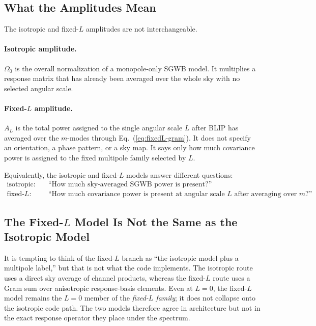\documentclass[11pt]{article}
\begin{document}
\subsection{What the Amplitudes Mean}
The isotropic and fixed-$L$ amplitudes are not interchangeable.

\paragraph{Isotropic amplitude.}
\(\Omega_0\) is the overall normalization of a monopole-only SGWB model. It multiplies a response matrix that has already been averaged over the whole sky with no selected angular scale.

\paragraph{Fixed-\texorpdfstring{$L$}{L} amplitude.}
\(A_L\) is the total power assigned to the single angular scale \(L\) after BLIP has averaged over the \(m\)-modes through Eq.~(\ref{eq:fixedL-gram}). It does not specify an orientation, a phase pattern, or a sky map. It says only how much covariance power is assigned to the fixed multipole family selected by \(L\).

Equivalently, the isotropic and fixed-$L$ models answer different questions:
\begin{align}
\text{isotropic:}\quad & \text{``How much sky-averaged SGWB power is present?''} \\
\text{fixed-}L:\quad & \text{``How much covariance power is present at angular scale }L\text{ after averaging over }m\text{?''}
\end{align}

\subsection{The Fixed-\texorpdfstring{$L$}{L} Model Is Not the Same as the Isotropic Model}
It is tempting to think of the fixed-$L$ branch as ``the isotropic model plus a multipole label,'' but that is not what the code implements. The isotropic route uses a direct sky average of channel products, whereas the fixed-$L$ route uses a Gram sum over anisotropic response-basis elements. Even at \(L=0\), the fixed-$L$ model remains the \(L=0\) member of the \emph{fixed-$L$ family}; it does not collapse onto the isotropic code path. The two models therefore agree in architecture but not in the exact response operator they place under the spectrum.
\end{document}
